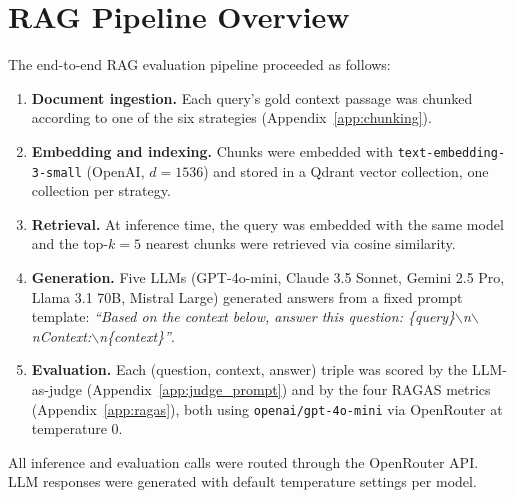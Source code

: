 \section{RAG Pipeline Overview}
\label{app:pipeline}

The end-to-end RAG evaluation pipeline proceeded as follows:

\begin{enumerate}
  \item \textbf{Document ingestion.} Each query's gold context passage was
    chunked according to one of the six strategies
    (Appendix~\ref{app:chunking}).
  \item \textbf{Embedding and indexing.} Chunks were embedded with
    \texttt{text-embedding-3-small} (OpenAI, $d = 1536$) and stored in a
    Qdrant vector collection, one collection per strategy.
  \item \textbf{Retrieval.} At inference time, the query was embedded with
    the same model and the top-$k = 5$ nearest chunks were retrieved via
    cosine similarity.
  \item \textbf{Generation.} Five LLMs (GPT-4o-mini, Claude 3.5 Sonnet,
    Gemini 2.5 Pro, Llama 3.1 70B, Mistral Large) generated answers from a
    fixed prompt template: \textit{``Based on the context below, answer this
    question: \{query\}$\backslash$n$\backslash$nContext:$\backslash$n\{context\}''}.
  \item \textbf{Evaluation.} Each (question, context, answer) triple was
    scored by the LLM-as-judge (Appendix~\ref{app:judge_prompt}) and by the
    four RAGAS metrics (Appendix~\ref{app:ragas}), both using
    \texttt{openai/gpt-4o-mini} via OpenRouter at temperature 0.
\end{enumerate}

All inference and evaluation calls were routed through the OpenRouter API.
LLM responses were generated with default temperature settings per model.

